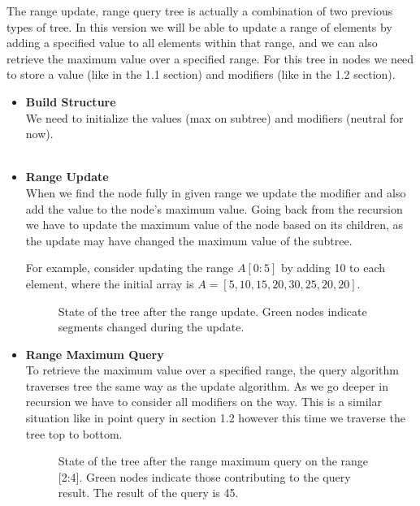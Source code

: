 \documentclass[11pt]{article}
\begin{document}
The range update, range query tree is actually a combination of two previous types of tree.
In this version we will be able to update a range of elements by adding a specified value to all elements within that range, and we can also retrieve the maximum value over a specified range.
For this tree in nodes we need to store a value (like in the 1.1 section) and modifiers (like in the 1.2 section).


\begin{itemize}
    \item \textbf{Build Structure} \\
    We need to initialize the values (max on subtree) and modifiers (neutral for now). \\
     \\

    \item \textbf{Range Update} \\
    When we find the node fully in given range we update the modifier and also add the value to the node's maximum value.
    Going back from the recursion we have to update the maximum value of the node based on its children, as the update may have changed the maximum value of the subtree.
     \\

    \FloatBarrier

    For example, consider updating the range \( A[0:5] \) by adding 10 to each element, where the initial array is \( A = [5, 10, 15, 20, 30, 25, 20, 20] \).

    \begin{figure}[H]
        \centering
        
        \caption{State of the tree after the range update. Green nodes indicate segments changed during the update.}
        \label{fig:segment_tree_4}
    \end{figure}

    \item \textbf{Range Maximum Query} \\
    To retrieve the maximum value over a specified range, the query algorithm traverses tree the same way as the update algorithm.
    As we go deeper in recursion we have to consider all modifiers on the way. This is a similar situation like in point query in section 1.2 however this time we traverse the tree top to bottom.
    

    \begin{figure}[H]
        \centering
        
        \caption{State of the tree after the range maximum query on the range [2:4]. Green nodes indicate those contributing to the query result. The result of the query is 45.}
        \label{fig:segment_tree_5}
    \end{figure}

\end{itemize}
\end{document}

